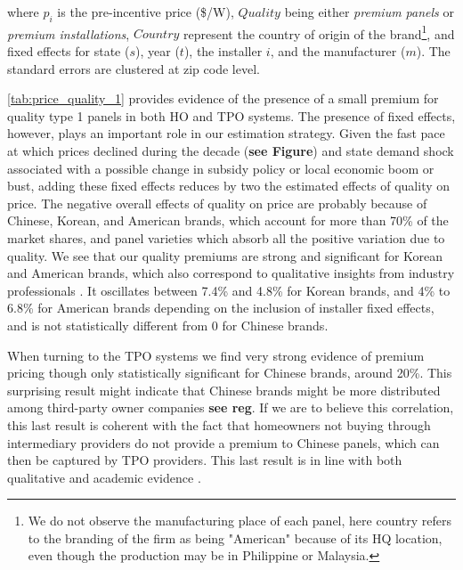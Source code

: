 where $p_i$ is the pre-incentive price (\$/W), $Quality$ being either \textit{premium panels} or \textit{premium installations}, $Country$ represent the country of origin of the brand\footnote{We do not observe the manufacturing place of each panel, here country refers to the branding of the firm as being "American" because of its HQ location, even though the production may be in Philippine or Malaysia.}, and fixed effects for state ($s$), year ($t$), the installer $i$, and the manufacturer ($m$). The standard errors are clustered at zip code level.

\begin{table}[H]
    \centering
    \caption{Price response to premium panels for HO and TPO systems}
    
    \label{tab:price_quality_1}
\end{table}

\autoref{tab:price_quality_1} provides evidence of the presence of a small premium for quality type 1 panels in both HO and TPO systems. The presence of fixed effects, however, plays an important role in our estimation strategy. Given the fast pace at which prices declined during the decade (\textbf{see Figure}) and state demand shock associated with a possible change in subsidy policy or local economic boom or bust, adding these fixed effects reduces by two the estimated effects of quality on price. The negative overall effects of quality on price are probably because of Chinese, Korean, and American brands, which account for more than 70\% of the market shares, and panel varieties which absorb all the positive variation due to quality. We see that our quality premiums are strong and significant for Korean and American brands, which also correspond to qualitative insights from industry professionals \citep{Compare2025sBest2024}. It oscillates between 7.4\% and 4.8\% for Korean brands, and 4\% to 6.8\% for American brands depending on the inclusion of installer fixed effects, and is not statistically different from 0 for Chinese brands. 

When turning to the TPO systems we find very strong evidence of premium pricing though only statistically significant for Chinese brands, around 20\%. This surprising result might indicate that Chinese brands might be more distributed among third-party owner companies \textbf{see reg}. If we are to believe this correlation, this last result is coherent with the fact that homeowners not buying through intermediary providers do not provide a premium to Chinese panels, which can then be captured by TPO providers. This last result is in line with both qualitative \citep{pyperDeepPoliticsDark2016} and academic evidence \citep{plessPassThroughTestMarket2019}.

